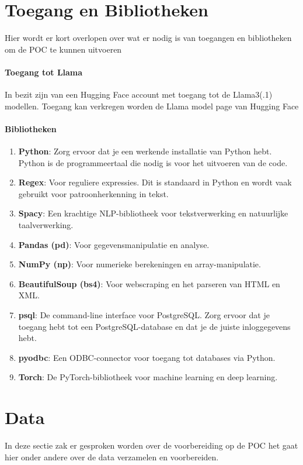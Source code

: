 \section{Toegang en Bibliotheken}
Hier wordt er kort overlopen over wat er nodig is van toegangen en bibliotheken om de POC te kunnen uitvoeren
\paragraph{Toegang tot Llama}
 In bezit zijn van een Hugging Face account met toegang tot de Llama3(.1) modellen. Toegang kan verkregen worden de Llama model page van Hugging Face
\paragraph{Bibliotheken}
\begin{enumerate}
    \item \textbf{Python}: Zorg ervoor dat je een werkende installatie van Python hebt. Python is de programmeertaal die nodig is voor het uitvoeren van de code.
    \item \textbf{Regex}: Voor reguliere expressies. Dit is standaard in Python en wordt vaak gebruikt voor patroonherkenning in tekst.
    \item \textbf{Spacy}: Een krachtige NLP-bibliotheek voor tekstverwerking en natuurlijke taalverwerking.
    \item \textbf{Pandas (pd)}: Voor gegevensmanipulatie en analyse.
    \item \textbf{NumPy (np)}: Voor numerieke berekeningen en array-manipulatie.
    \item \textbf{BeautifulSoup (bs4)}: Voor webscraping en het parseren van HTML en XML.
    \item \textbf{psql}: De command-line interface voor PostgreSQL. Zorg ervoor dat je toegang hebt tot een PostgreSQL-database en dat je de juiste inloggegevens hebt.
    \item \textbf{pyodbc}: Een ODBC-connector voor toegang tot databases via Python.
    \item \textbf{Torch}: De PyTorch-bibliotheek voor machine learning en deep learning.
\end{enumerate}


\section{Data}
\label{sec:Data}
In deze sectie zak er gesproken worden over de voorbereiding op de POC het gaat hier onder andere over de data verzamelen en voorbereiden.


